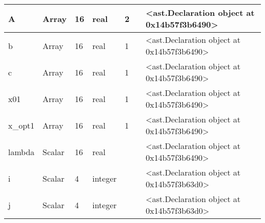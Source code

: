 \documentclass{report}
\begin{document}
\begin{center}
\begin{longtable}{|p{3.5cm}|p{1.5cm}|p{1.5cm}|p{1.5cm}|p{1cm}|p{2cm}|p{4cm}| }
A & Array & 16 & real & 2 &  & <ast.Declaration object at 0x14b57f3b6490> \\\hline

b & Array & 16 & real & 1 &  & <ast.Declaration object at 0x14b57f3b6490> \\\hline

c & Array & 16 & real & 1 &  & <ast.Declaration object at 0x14b57f3b6490> \\\hline

x01 & Array & 16 & real & 1 &  & <ast.Declaration object at 0x14b57f3b6490> \\\hline

x\_opt1 & Array & 16 & real & 1 &  & <ast.Declaration object at 0x14b57f3b6490> \\\hline

lambda & Scalar & 16 & real &  &  & <ast.Declaration object at 0x14b57f3b6490> \\\hline

i & Scalar & 4 & integer &  &  & <ast.Declaration object at 0x14b57f3b63d0> \\\hline

j & Scalar & 4 & integer &  &  & <ast.Declaration object at 0x14b57f3b63d0> \\\hline

\end{longtable}
\end{center}

 \vspace{1cm}
\end{document}
